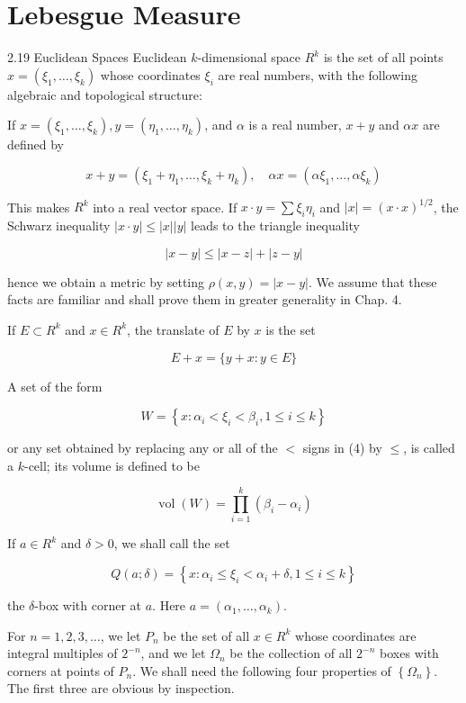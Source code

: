 \documentclass[10pt]{article}
\begin{document}
\section{Lebesgue Measure}
2.19 Euclidean Spaces Euclidean $k$-dimensional space $R^{k}$ is the set of all points $x=\left(\xi_{1}, \ldots, \xi_{k}\right)$ whose coordinates $\xi_{i}$ are real numbers, with the following algebraic and topological structure:

If $x=\left(\xi_{1}, \ldots, \xi_{k}\right), y=\left(\eta_{1}, \ldots, \eta_{k}\right)$, and $\alpha$ is a real number, $x+y$ and $\alpha x$ are defined by

$$
x+y=\left(\xi_{1}+\eta_{1}, \ldots, \xi_{k}+\eta_{k}\right), \quad \alpha x=\left(\alpha \xi_{1}, \ldots, \alpha \xi_{k}\right)
$$

This makes $R^{k}$ into a real vector space. If $x \cdot y=\sum \xi_{i} \eta_{i}$ and $|x|=(x \cdot x)^{1 / 2}$, the Schwarz inequality $|x \cdot y| \leq|x||y|$ leads to the triangle inequality

$$
|x-y| \leq|x-z|+|z-y|
$$

hence we obtain a metric by setting $\rho(x, y)=|x-y|$. We assume that these facts are familiar and shall prove them in greater generality in Chap. 4.

If $E \subset R^{k}$ and $x \in R^{k}$, the translate of $E$ by $x$ is the set

$$
E+x=\{y+x: y \in E\}
$$

A set of the form

$$
W=\left\{x: \alpha_{i}<\xi_{i}<\beta_{i}, 1 \leq i \leq k\right\}
$$

or any set obtained by replacing any or all of the $<$ signs in (4) by $\leq$, is called a $k$-cell; its volume is defined to be

$$
\operatorname{vol}(W)=\prod_{i=1}^{k}\left(\beta_{i}-\alpha_{i}\right)
$$

If $a \in R^{k}$ and $\delta>0$, we shall call the set

$$
Q(a ; \delta)=\left\{x: \alpha_{i} \leq \xi_{i}<\alpha_{i}+\delta, 1 \leq i \leq k\right\}
$$

the $\delta$-box with corner at $a$. Here $a=\left(\alpha_{1}, \ldots, \alpha_{k}\right)$.

For $n=1,2,3, \ldots$, we let $P_{n}$ be the set of all $x \in R^{k}$ whose coordinates are integral multiples of $2^{-n}$, and we let $\Omega_{n}$ be the collection of all $2^{-n}$ boxes with corners at points of $P_{n}$. We shall need the following four properties of $\left\{\Omega_{n}\right\}$. The first three are obvious by inspection.
\end{document}
